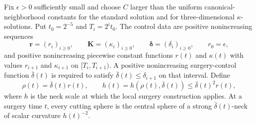\begin{definition}
\label{def:controlled-surgery-parameters}
\notready
Fix $\epsilon>0$ sufficiently small and choose $C$ larger than the uniform
canonical-neighborhood constants for the standard solution and for
three-dimensional $\kappa$-solutions.  Put $t_0=2^{-5}$ and
$T_i=2^it_0$.  The control data are positive nonincreasing sequences
\[
 \mathbf r=(r_i)_{i\ge0},\qquad
 \mathbf K=(\kappa_i)_{i\ge0},\qquad
 \boldsymbol\delta=(\delta_i)_{i\ge0},
 \qquad r_0=\epsilon,
\]
and positive nonincreasing piecewise constant functions $r(t)$ and
$\kappa(t)$ with values $r_{i+1}$ and $\kappa_{i+1}$ on
$[T_i,T_{i+1})$.  A positive nonincreasing surgery-control function
$\bar\delta(t)$ is required to satisfy
$\bar\delta(t)\le\delta_{i+1}$ on that interval.  Define
\[
 \rho(t)=\bar\delta(t)r(t),
 \qquad
 h(t)=h(\rho(t),\bar\delta(t))
 \le \bar\delta(t)^2r(t),
\]
where $h$ is the neck scale at which the local surgery construction applies.
At a surgery time $t$, every cutting sphere is the central sphere of a strong
$\bar\delta(t)$-neck of scalar curvature $h(t)^{-2}$.
\end{definition}

